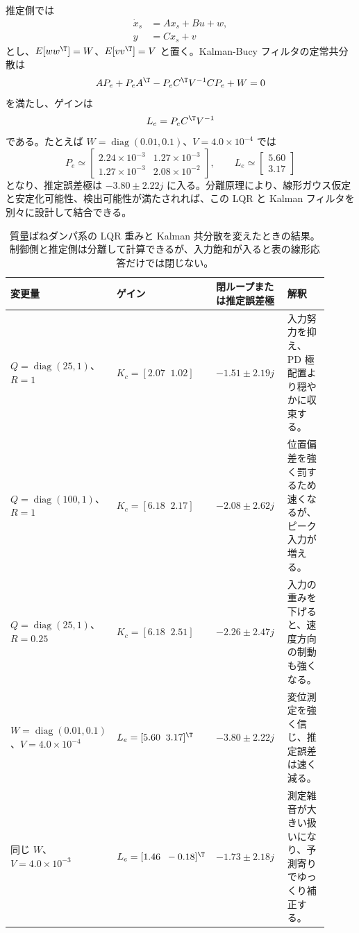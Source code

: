 推定側では
\begin{align}
  \dot{x}_s&=Ax_s+Bu+w,\\
  y&=Cx_s+v
\end{align}
とし、$E[ww^\T]=W$、$E[vv^\T]=V$ と置く。Kalman-Bucy フィルタの定常共分散は
\begin{equation}
  AP_e+P_eA^\T-P_eC^\T V^{-1}CP_e+W=0
\end{equation}
を満たし、ゲインは
\begin{equation}
  L_e=P_eC^\T V^{-1}
\end{equation}
である。たとえば $W=\operatorname{diag}(0.01,0.1)$、$V=4.0\times10^{-4}$ では
\begin{equation}
  P_e\simeq
  \begin{bmatrix}
    2.24\times10^{-3}&1.27\times10^{-3}\\
    1.27\times10^{-3}&2.08\times10^{-2}
  \end{bmatrix},
  \qquad
  L_e\simeq
  \begin{bmatrix}
    5.60\\3.17
  \end{bmatrix}
\end{equation}
となり、推定誤差極は $-3.80\pm2.22j$ に入る。分離原理により、線形ガウス仮定と安定化可能性、検出可能性が満たされれば、この LQR と Kalman フィルタを別々に設計して結合できる。

\begin{table}[tb]
  \centering
  \footnotesize
  \caption{質量ばねダンパ系の LQR 重みと Kalman 共分散を変えたときの結果。制御側と推定側は分離して計算できるが、入力飽和が入ると表の線形応答だけでは閉じない。}
  \label{tab:w08-lqg-riccati-covariance}
  \begin{tabular}{@{}>{\raggedright\arraybackslash}p{0.19\linewidth}>{\raggedright\arraybackslash}p{0.25\linewidth}>{\raggedright\arraybackslash}p{0.25\linewidth}>{\raggedright\arraybackslash}p{0.22\linewidth}@{}}
    \hline
    変更量 & ゲイン & 閉ループまたは推定誤差極 & 解釈 \\
    \hline
    $Q=\operatorname{diag}(25,1)$、$R=1$ &
    $K_c=[2.07\;\;1.02]$ &
    $-1.51\pm2.19j$ &
    入力努力を抑え、PD 極配置より穏やかに収束する。 \\
    $Q=\operatorname{diag}(100,1)$、$R=1$ &
    $K_c=[6.18\;\;2.17]$ &
    $-2.08\pm2.62j$ &
    位置偏差を強く罰するため速くなるが、ピーク入力が増える。 \\
    $Q=\operatorname{diag}(25,1)$、$R=0.25$ &
    $K_c=[6.18\;\;2.51]$ &
    $-2.26\pm2.47j$ &
    入力の重みを下げると、速度方向の制動も強くなる。 \\
    $W=\operatorname{diag}(0.01,0.1)$、$V=4.0\times10^{-4}$ &
    $L_e=[5.60\;\;3.17]^\T$ &
    $-3.80\pm2.22j$ &
    変位測定を強く信じ、推定誤差は速く減る。 \\
    同じ $W$、$V=4.0\times10^{-3}$ &
    $L_e=[1.46\;\;-0.18]^\T$ &
    $-1.73\pm2.18j$ &
    測定雑音が大きい扱いになり、予測寄りでゆっくり補正する。 \\
    \hline
  \end{tabular}
\end{table}

